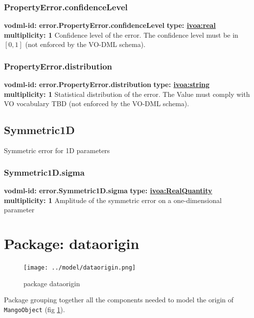     \subsubsection{PropertyError.confidenceLevel}
    \textbf{vodml-id: error.PropertyError.confidenceLevel} \newline
    \textbf{type: \hyperref[sect:ivoa]{ivoa:real}} \newline
    \textbf{multiplicity: 1} \newline
    Confidence level of the error. The confidence level must be in $[0, 1]$ (not enforced by the VO-DML schema).

    \subsubsection{PropertyError.distribution}
    \textbf{vodml-id: error.PropertyError.distribution} \newline
    \textbf{type: \hyperref[sect:ivoa]{ivoa:string}} \newline
    \textbf{multiplicity: 1} \newline
    Statistical distribution of the error. The Value must comply with VO vocabulary TBD (not enforced by the VO-DML schema).

  \subsection{Symmetric1D}
    \label{sect:error.Symmetric1D}
    Symmetric error for 1D parameters

    \subsubsection{Symmetric1D.sigma}
    \textbf{vodml-id: error.Symmetric1D.sigma} \newline
    \textbf{type: \hyperref[sect:ivoa]{ivoa:RealQuantity}} \newline
    \textbf{multiplicity: 1} \newline
    Amplitude of the symmetric error on a one-dimensional parameter

\section{Package: dataorigin}
    \begin{figure}[h]
    \texttt{[image: ../model/dataorigin.png]}
    \caption{package dataorigin}
    \label{fig:dataorigin}
    \end{figure}
    Package grouping together all the components needed to model the origin of \texttt{MangoObject} (fig \ref{fig:dataorigin}).

